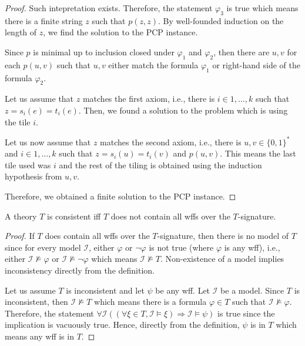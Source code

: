 \begin{proof}
    Such intepretation exists. Therefore, the statement $\varphi_3$ is true which means there is a finite string $z$ such that $p(z, z)$. By well-founded induction on the length of $z$, we find the solution to the PCP instance.

    Since $p$ is minimal up to inclusion closed under $\varphi_1$ and $\varphi_2$, then there are $u, v$ for each $p(u, v)$ such that $u, v$ either match the formula $\varphi_1$ or right-hand side of the formula $\varphi_2$.

    Let us assume that $z$ matches the first axiom, i.e., there is $i \in 1, \ldots, k$ such that $z = s_i(e) = t_i(e)$. Then, we found a solution to the problem which is using the tile $i$.

    Let us now assume that $z$ matches the second axiom, i.e., there is $u, v \in \{0, 1\}^{*}$ and $i \in 1, \ldots, k$ such that $z = s_i(u) = t_i(v)$ and $p(u, v)$. This means the last tile used was $i$ and the rest of the tiling is obtained using the induction hypothesis from $u, v$.

    Therefore, we obtained a finite solution to the PCP instance.


\end{proof}

\begin{theorem}
   A theory $T$ is consistent iff $T$ does not contain all wffs over the $T$-signature.
\end{theorem}

\begin{proof}
    If $T$ does contain all wffs over the $T$-signature, then there is no model of $T$ since for every model $\mathcal{I}$, either $\varphi$ or $\neg \varphi$ is not true (where $\varphi$ is any wff), i.e., either $\mathcal{I} \not\vDash \varphi$ or $\mathcal{I} \not\vDash \neg\varphi$ which means $\mathcal{I} \not\vDash T$. Non-existence of a model implies inconsistency directly from the definition.

    Let us assume $T$ is inconsistent and let $\psi$ be any wff. Let $\mathcal{I}$ be a model. Since $T$ is inconsistent, then $\mathcal{I} \not\vDash T$ which means there is a formula $\varphi \in T$ such that $\mathcal{I} \not\vDash \varphi$. Therefore, the statement $\forall \mathcal{I} ((\forall \xi \in T, \mathcal{I} \vDash \xi) \Rightarrow \mathcal{I} \vDash \psi)$ is true since the implication is vacuously true. Hence, directly from the definition, $\psi$ is in $T$ which means any wff is in $T$.
\end{proof}



